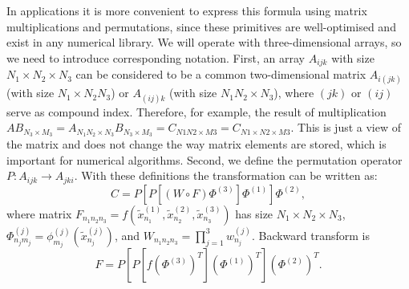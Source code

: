 In applications it is more convenient to express this formula using matrix multiplications and permutations,
since these primitives are well-optimised and exist in any numerical library.
We will operate with three-dimensional arrays,
so we need to introduce corresponding notation.
First, an array $A_{ijk}$ with size $N_1 \times N_2 \times N_3$ can be considered to be a common two-dimensional matrix $A_{i(jk)}$ (with size $N_1 \times N_2 N_3$) or $A_{(ij)k}$ (with size $N_1 N_2 \times N_3$),
where $(jk)$ or $(ij)$ serve as compound index.
Therefore, for example, the result of multiplication $AB_{N_3 \times M_3} = A_{N_1 N_2 \times N_3} B_{N_3 \times M_3} = C_{N1 N2 \times M3} = C_{N1 \times N2 \times M3}$.
This is just a view of the matrix and does not change the way matrix elements are stored,
which is important for numerical algorithms.
Second, we define the permutation operator $P: A_{ijk} \rightarrow A_{jki}$.
With these definitions the transformation can be written as:
\[
	C = P[P[(W \circ F) \Phi^{(3)}] \Phi^{(1)}] \Phi^{(2)},
\]
where matrix $F_{n_1 n_2 n_3} = f(\tilde{x}_{n_1}^{(1)}, \tilde{x}_{n_2}^{(2)}, \tilde{x}_{n_3}^{(3)})$ has size $N_1 \times N_2 \times N_3$,
$\Phi^{(j)}_{n_j m_j} = \phi_{m_j}^{(j)} (\tilde{x}_{n_j}^{(j)})$,
and $W_{n_1 n_2 n_3} = \prod_{j=1}^3 w_{n_j}^{(j)}$.
Backward transform is
\[
	F = P[P[f (\Phi^{(3)})^T] (\Phi^{(1)})^T] (\Phi^{(2)})^T.
\]
